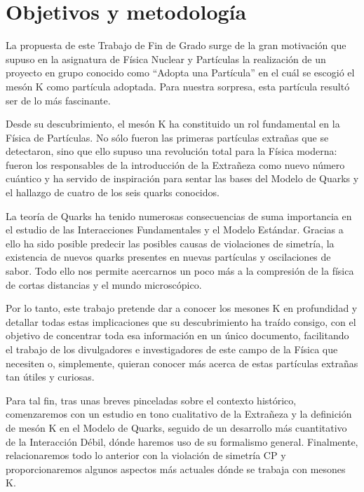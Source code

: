 \chapter*{Objetivos y metodología}
\label{cap:objetivos}

La propuesta de este Trabajo de Fin de Grado surge de la gran motivación que supuso en la asignatura de Física Nuclear y Partículas la realización de un proyecto en grupo conocido como ``Adopta una Partícula'' en el cuál se escogió el mesón K como partícula adoptada. Para nuestra sorpresa, esta partícula resultó ser de lo más fascinante.

Desde su descubrimiento, el mesón K ha constituido un rol fundamental en la Física de Partículas. No sólo fueron las primeras partículas extrañas que se detectaron, sino que ello supuso una revolución total para la Física moderna: fueron los responsables de la introducción de la Extrañeza como nuevo número cuántico y ha servido de inspiración para sentar las bases del Modelo de Quarks y el hallazgo de cuatro de los seis quarks conocidos.

La teoría de Quarks ha tenido numerosas consecuencias de suma importancia en el estudio de las Interacciones Fundamentales y el Modelo Estándar. Gracias a ello ha sido posible predecir las posibles causas de violaciones de simetría, la existencia de nuevos quarks presentes en nuevas partículas y oscilaciones de sabor. Todo ello nos permite acercarnos un poco más a la compresión de la física de cortas distancias y el mundo microscópico. 

Por lo tanto, este trabajo pretende dar a conocer los mesones K en profundidad y detallar todas estas implicaciones que su descubrimiento ha traído consigo, con el objetivo de concentrar toda esa información en un único documento, facilitando el trabajo de los divulgadores e investigadores de este campo de la Física que necesiten o, simplemente, quieran conocer más acerca de estas partículas extrañas tan útiles y curiosas.

Para tal fin, tras unas breves pinceladas sobre el contexto histórico, comenzaremos con un estudio en tono cualitativo de la Extrañeza y la definición de mesón K en el Modelo de Quarks, seguido de un desarrollo más cuantitativo de la Interacción Débil, dónde haremos uso de su formalismo general. Finalmente, relacionaremos todo lo anterior con la violación de simetría CP y proporcionaremos algunos aspectos más actuales dónde se trabaja con mesones K.



